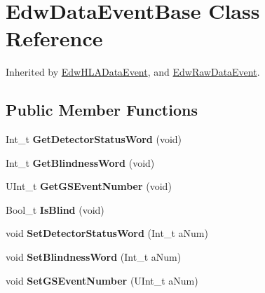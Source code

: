 \hypertarget{class_edw_data_event_base}{
\section{EdwDataEventBase Class Reference}
\label{class_edw_data_event_base}
}


Inherited by \hyperlink{class_edw_h_l_a_data_event}{EdwHLADataEvent}, and \hyperlink{class_edw_raw_data_event}{EdwRawDataEvent}.

\subsection*{Public Member Functions}
\begin{DoxyCompactItemize}
\item 
\hypertarget{class_edw_data_event_base_af860f1f2515853caf6b1b9cc7b1c0968}{
Int\_\-t {\bfseries GetDetectorStatusWord} (void)}
\label{class_edw_data_event_base_af860f1f2515853caf6b1b9cc7b1c0968}

\item 
\hypertarget{class_edw_data_event_base_a236667350997ebaedcccef5266ad7965}{
Int\_\-t {\bfseries GetBlindnessWord} (void)}
\label{class_edw_data_event_base_a236667350997ebaedcccef5266ad7965}

\item 
\hypertarget{class_edw_data_event_base_abba408617a3fae64365ebd28d77fb10a}{
UInt\_\-t {\bfseries GetGSEventNumber} (void)}
\label{class_edw_data_event_base_abba408617a3fae64365ebd28d77fb10a}

\item 
\hypertarget{class_edw_data_event_base_a98628397a07d52db00d740240c5891c0}{
Bool\_\-t {\bfseries IsBlind} (void)}
\label{class_edw_data_event_base_a98628397a07d52db00d740240c5891c0}

\item 
\hypertarget{class_edw_data_event_base_a7d0d1541bacc859c366985a6fc875fde}{
void {\bfseries SetDetectorStatusWord} (Int\_\-t aNum)}
\label{class_edw_data_event_base_a7d0d1541bacc859c366985a6fc875fde}

\item 
\hypertarget{class_edw_data_event_base_a70e235e1396f7545081c8742346c25ab}{
void {\bfseries SetBlindnessWord} (Int\_\-t aNum)}
\label{class_edw_data_event_base_a70e235e1396f7545081c8742346c25ab}

\item 
\hypertarget{class_edw_data_event_base_adfc9a8be251a88e75af879486917ee27}{
void {\bfseries SetGSEventNumber} (UInt\_\-t aNum)}
\label{class_edw_data_event_base_adfc9a8be251a88e75af879486917ee27}

\end{DoxyCompactItemize}


